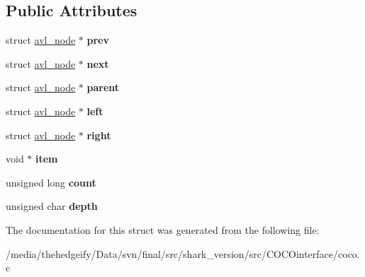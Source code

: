 \subsection*{Public Attributes}
\begin{DoxyCompactItemize}
\item 
struct \hyperlink{structavl__node}{avl\+\_\+node} $\ast$ {\bfseries prev}\hypertarget{structavl__node_ac25d9a8722ef2407ce7b4d68433383ff}{}\label{structavl__node_ac25d9a8722ef2407ce7b4d68433383ff}

\item 
struct \hyperlink{structavl__node}{avl\+\_\+node} $\ast$ {\bfseries next}\hypertarget{structavl__node_a27fa7bd91c913b8a1a8c77cb91300813}{}\label{structavl__node_a27fa7bd91c913b8a1a8c77cb91300813}

\item 
struct \hyperlink{structavl__node}{avl\+\_\+node} $\ast$ {\bfseries parent}\hypertarget{structavl__node_ac2a269b2aaa53985c85408f4ac31222c}{}\label{structavl__node_ac2a269b2aaa53985c85408f4ac31222c}

\item 
struct \hyperlink{structavl__node}{avl\+\_\+node} $\ast$ {\bfseries left}\hypertarget{structavl__node_a437d9ef012fc682b8bdb5e2faab03cd2}{}\label{structavl__node_a437d9ef012fc682b8bdb5e2faab03cd2}

\item 
struct \hyperlink{structavl__node}{avl\+\_\+node} $\ast$ {\bfseries right}\hypertarget{structavl__node_a8102bb7bf760222eaaedb3add57d7606}{}\label{structavl__node_a8102bb7bf760222eaaedb3add57d7606}

\item 
void $\ast$ {\bfseries item}\hypertarget{structavl__node_a6d448adab94a8b84ea9578bb5707ef76}{}\label{structavl__node_a6d448adab94a8b84ea9578bb5707ef76}

\item 
unsigned long {\bfseries count}\hypertarget{structavl__node_a32c23c895da37f0b510d8710452288dd}{}\label{structavl__node_a32c23c895da37f0b510d8710452288dd}

\item 
unsigned char {\bfseries depth}\hypertarget{structavl__node_a7f28714d3942860849e4334b6e476b5d}{}\label{structavl__node_a7f28714d3942860849e4334b6e476b5d}

\end{DoxyCompactItemize}


The documentation for this struct was generated from the following file\+:\begin{DoxyCompactItemize}
\item 
/media/thehedgeify/\+Data/svn/final/src/shark\+\_\+version/src/\+C\+O\+C\+Ointerface/coco.\+c\end{DoxyCompactItemize}
